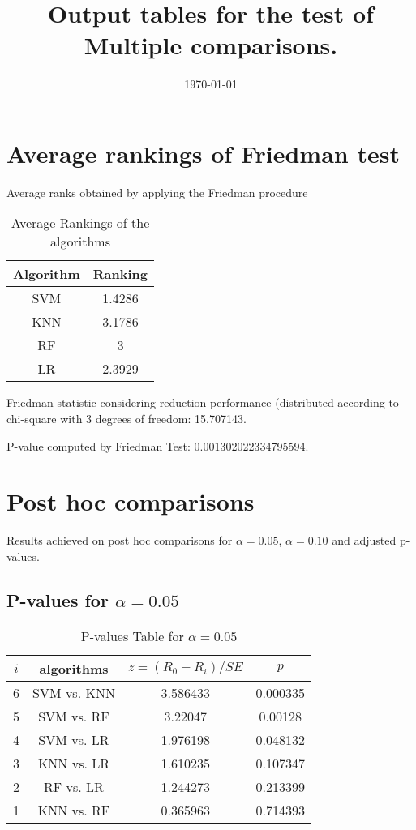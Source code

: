 \documentclass[a4paper,10pt]{article}
\title{Output tables for the test of Multiple comparisons.}
\author{}
\date{\today}
\begin{document}
\begin{landscape}
\pagestyle{empty}
\maketitle
\thispagestyle{empty}
\section{Average rankings of Friedman test}



Average ranks obtained by applying the Friedman procedure

\begin{table}[!htp]
\centering
\begin{tabular}{|c|c|}\hline
Algorithm&Ranking\\\hline
SVM & 1.4286\\
KNN & 3.1786\\
RF & 3\\
LR & 2.3929\\
\hline
\end{tabular}
\caption{Average Rankings of the algorithms}
\end{table}

Friedman statistic considering reduction performance (distributed according to chi-square with 3 degrees of freedom: 15.707143.

P-value computed by Friedman Test: 0.001302022334795594.\newline



\pagebreak

\section{Post hoc comparisons}

Results achieved on post hoc comparisons for $\alpha = 0.05$, $\alpha = 0.10$ and adjusted p-values.

\subsection{P-values for $\alpha=0.05$}

\begin{table}[!htp]
\centering\scriptsize
\begin{tabular}{cccc}
$i$&algorithms&$z=(R_0 - R_i)/SE$&$p$\\
\hline6&SVM vs. KNN&3.586433&0.000335\\
5&SVM vs. RF&3.22047&0.00128\\
4&SVM vs. LR&1.976198&0.048132\\
3&KNN vs. LR&1.610235&0.107347\\
2&RF vs. LR&1.244273&0.213399\\
1&KNN vs. RF&0.365963&0.714393\\
\hline
\end{tabular}
\caption{P-values Table for $\alpha=0.05$}
\end{table}\pagebreak


\end{landscape}
\end{document}
